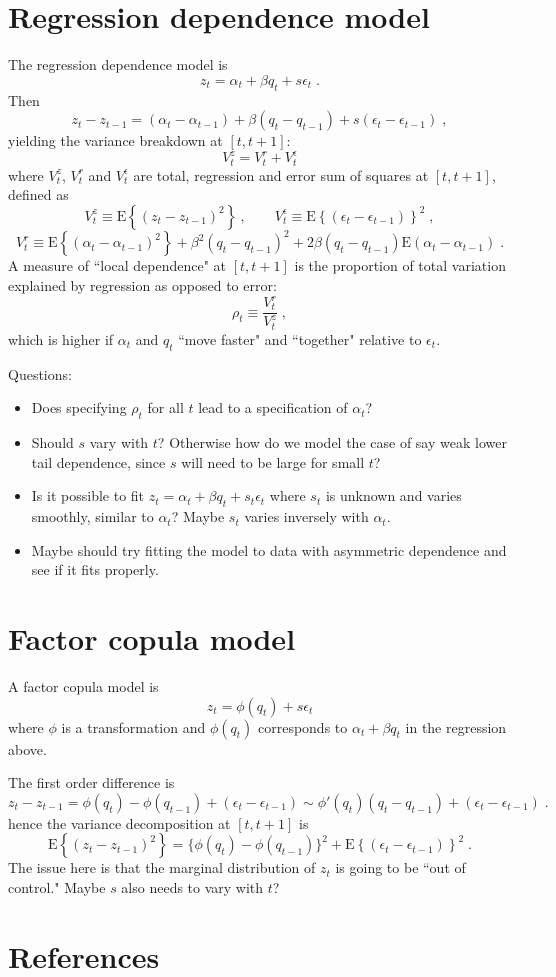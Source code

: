 \documentclass[authoryear]{elsarticle}
\newcommand{\E}{\mathrm{E}}
\newcommand{\eps}{\epsilon}
\newcommand{\bi}{\begin{itemize}}
\newcommand{\ei}{\end{itemize}}
\renewcommand{\i}{\item}
\newcommand{\cq}{\ , \qquad}
\begin{document}
\section{Regression dependence model}

The regression dependence model is
$$
z_t=\alpha_t+\beta q_t + s\eps_t \;.
$$
Then
$$
z_t-z_{t-1}=(\alpha_t-\alpha_{t-1})+\beta (q_t-q_{t-1}) + s(\eps_t-\eps_{t-1}) \;,
$$
yielding the variance breakdown at $[t,t+1]$:
$$
V_t^z=V_t^r+V_t^\eps 
$$
where $V_t^z$, $V_t^r$ and $V_t^\eps$ are total, regression and error sum of squares at $[t,t+1]$, defined as
$$
V_t^z \equiv \E\left\{(z_t-z_{t-1})^2\right\} \cq V_t^\eps \equiv \E\left\{(\eps_t-\eps_{t-1})\right\}^2 \;,
$$
$$ 
V_t^r \equiv \E\left\{(\alpha_t-\alpha_{t-1})^2\right\}+\beta^2 (q_t-q_{t-1})^2
+2\beta (q_t-q_{t-1}) \E(\alpha_t-\alpha_{t-1}) \;.
$$
A measure of ``local dependence" at $[t,t+1]$ is the proportion of total variation explained by regression as opposed to error:
$$
\rho_t \equiv \frac{V_t^r}{V_t^z} \;,
$$
which is higher if $\alpha_t$ and $q_t$ ``move faster" and ``together" relative to $\eps_t$.

Questions:
\bi
\i Does specifying $\rho_t$ for all $t$ lead to a specification of $\alpha_t$?

\i Should $s$ vary with $t$? Otherwise how do we model the case of say weak lower tail dependence, since $s$ will need to be large for small $t$? 

\i Is it possible to fit $z_t=\alpha_t+\beta q_t + s_t\eps_t$ where $s_t$ is unknown and varies smoothly, similar to $\alpha_t$? Maybe $s_t$ varies inversely with $\alpha_t$.

\i Maybe should try fitting the model to data with asymmetric dependence and see if it fits properly.
\ei


\section{Factor copula model}

A factor copula model is
$$
z_t=\phi(q_t)+s\eps_t
$$
where $\phi$ is a transformation and $\phi(q_t)$ corresponds to $\alpha_t+\beta q_t$ in the regression above.

The first order difference is
$$
z_t-z_{t-1}=\phi(q_t)-\phi(q_{t-1})+(\eps_t-\eps_{t-1})
\sim \phi'(q_t)(q_t-q_{t-1}) +(\eps_t-\eps_{t-1}) \;.
$$
hence the variance decomposition at $[t,t+1]$ is
$$
\E\left\{(z_t-z_{t-1})^2\right\} = \{\phi(q_t)-\phi(q_{t-1})\}^2  + \E\left\{(\eps_t-\eps_{t-1})\right\}^2 \;.
$$
The issue here is that the marginal distribution of $z_t$ is going to be ``out of control." Maybe $s$ also needs to vary with $t$?

\section*{References}

\end{document}
